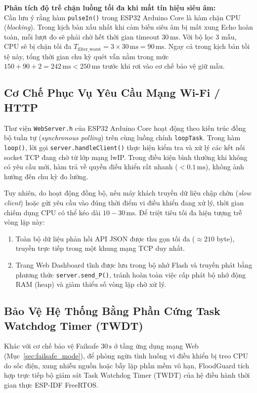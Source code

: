 \noindent\textbf{Phân tích độ trễ chặn luồng tối đa khi mất tín hiệu siêu âm:}\\
Cần lưu ý rằng hàm \texttt{pulseIn()} trong ESP32 Arduino Core là hàm chặn CPU (\textit{blocking}). Trong kịch bản xấu nhất khi cảm biến siêu âm bị mất xung Echo hoàn toàn, mỗi lượt đo sẽ phải chờ hết thời gian timeout $30\,\text{ms}$. Với bộ lọc 3 mẫu, CPU sẽ bị chặn tối đa $T_{\text{filter\_worst}} = 3 \times 30\,\text{ms} = 90\,\text{ms}$. Ngay cả trong kịch bản tồi tệ này, tổng thời gian chu kỳ quét vẫn nằm trong mức $150 + 90 + 2 = 242\,\text{ms} < 250\,\text{ms}$ trước khi rơi vào cơ chế bảo vệ giữ mẫu.

\subsection{Cơ Chế Phục Vụ Yêu Cầu Mạng Wi-Fi / HTTP}
Thư viện \texttt{WebServer.h} của ESP32 Arduino Core hoạt động theo kiến trúc đồng bộ tuần tự (\textit{synchronous polling}) trên cùng luồng chính \texttt{loopTask}. Trong hàm \texttt{loop()}, lời gọi \texttt{server.handleClient()} thực hiện kiểm tra và xử lý các kết nối socket TCP đang chờ từ lớp mạng lwIP. Trong điều kiện bình thường khi không có yêu cầu mới, hàm trả về quyền điều khiển rất nhanh ($< 0.1\,\text{ms}$), không ảnh hưởng đến chu kỳ đo lường.

Tuy nhiên, do hoạt động đồng bộ, nếu máy khách truyền dữ liệu chập chờn (\textit{slow client}) hoặc gửi yêu cầu vào đúng thời điểm vi điều khiển đang xử lý, thời gian chiếm dụng CPU có thể kéo dài $10 - 30\,\text{ms}$. Để triệt tiêu tối đa hiện tượng trễ vòng lặp này:
\begin{enumerate}
    \item Toàn bộ dữ liệu phản hồi API JSON được thu gọn tối đa ($\approx 210$ byte), truyền trực tiếp trong một khung mạng TCP duy nhất.
    \item Trang Web Dashboard tĩnh được lưu trong bộ nhớ Flash và truyền phát bằng phương thức \texttt{server.send\_P()}, tránh hoàn toàn việc cấp phát bộ nhớ động RAM (heap) và giảm thiểu số vòng lặp chờ xử lý.
\end{enumerate}

\subsection{Bảo Vệ Hệ Thống Bằng Phần Cứng Task Watchdog Timer (TWDT)}
Khác với cơ chế bảo vệ Failsafe $30\,\text{s}$ ở tầng ứng dụng mạng Web (Mục~\ref{sec:failsafe_mode}), để phòng ngừa tình huống vi điều khiển bị treo CPU do sốc điện, xung nhiễu nguồn hoặc bẫy lặp phần mềm vô hạn, FloodGuard tích hợp trực tiếp bộ giám sát Task Watchdog Timer (TWDT) của hệ điều hành thời gian thực ESP-IDF FreeRTOS.

